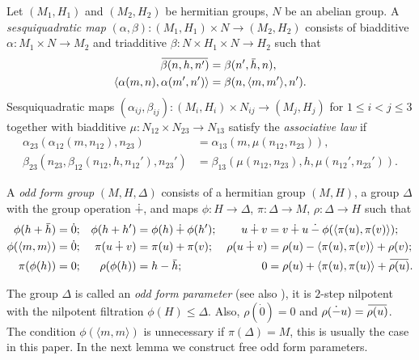 \documentclass{article}
\theoremstyle{definition}
\newcommand{\dotminus}{\mathbin{\dot{-}}}
\newcommand{\inv}[1]{
    \!\;\overline{
        \!\!\:#1\vphantom !\!\!\:
    }\;\!
}
\begin{document}
Let \((M_1, H_1)\) and \((M_2, H_2)\) be hermitian groups, \(N\) be an abelian group. A \textit{sesquiquadratic map} \(
    (\alpha, \beta)
    \colon (M_1, H_1) \times N
    \to (M_2, H_2)
\) consists of biadditive \(
    \alpha \colon M_1 \times N \to M_2
\) and triadditive \(
    \beta \colon N \times H_1 \times N \to H_2
\) such that
\begin{align*}
    \inv{\beta(n, h, n')} &= \beta(n', \inv h, n),\\
    \langle \alpha(m, n), \alpha(m', n') \rangle
    &=
    \beta(n, \langle m, m' \rangle, n').
\end{align*}
Sesquiquadratic maps \(
    (\alpha_{ij}, \beta_{ij})
    \colon (M_i, H_i) \times N_{ij}
    \to (M_j, H_j)
\) for \(1 \leq i < j \leq 3\) together with biadditive \(
    \mu \colon N_{12} \times N_{23} \to N_{13}
\) satisfy the \textit{associative law} if
\begin{align*}
    \alpha_{23}(\alpha_{12}(m, n_{12}), n_{23})
    &=
    \alpha_{13}(m, \mu(n_{12}, n_{23})),\\
    \beta_{23}(
        n_{23},
        \beta_{12}(n_{12}, h, n_{12}'),
        n_{23}'
    )
    &=
    \beta_{13}(
        \mu(n_{12}, n_{23}),
        h,
        \mu(n_{12}', n_{23}')
    ).
\end{align*}

A \textit{odd form group} \(
    (M, H, \Delta)
\) consists of a hermitian group \((M, H)\), a group \(\Delta\) with the group operation \(\dotplus\), and maps \(
    \phi \colon H \to \Delta
\), \(
    \pi \colon \Delta \to M
\), \(
    \rho \colon \Delta \to H
\) such that
\begin{align*}
    \phi(h + \inv h) &= \dot 0;
    &
    \phi(h + h') &= \phi(h) \dotplus \phi(h');
    &
    u
    \dotplus v
    &=
    v
    \dotplus u
    \dotminus \phi(\langle \pi(u), \pi(v) \rangle);
    \\
    \phi(\langle m, m \rangle) &= \dot 0;
    &
    \pi(u \dotplus v) &= \pi(u) + \pi(v);
    &
    \rho(u \dotplus v)
    &=
    \rho(u)
    - \langle \pi(u), \pi(v) \rangle
    + \rho(v);
    \\
    \pi(\phi(h)) &= 0;
    &
    \rho(\phi(h)) &= h - \inv h;
    &
    0 &=
    \rho(u)
    + \langle \pi(u), \pi(u) \rangle
    + \inv{\rho(u)}.
\end{align*}

The group \(\Delta\) is called an \textit{odd form parameter} (see also \cite[\S2]{odd-def-petrov}), it is \(2\)-step nilpotent with the nilpotent filtration \(\phi(H) \leq \Delta\). Also, \(
    \rho(\dot 0) = 0
\) and \(
    \rho(\dotminus u) = \inv{\rho(u)}
\). The condition \(\phi(\langle m, m \rangle)\) is unnecessary if \(\pi(\Delta) = M\), this is usually the case in this paper. In the next lemma we construct free odd form parameters.
\end{document}
